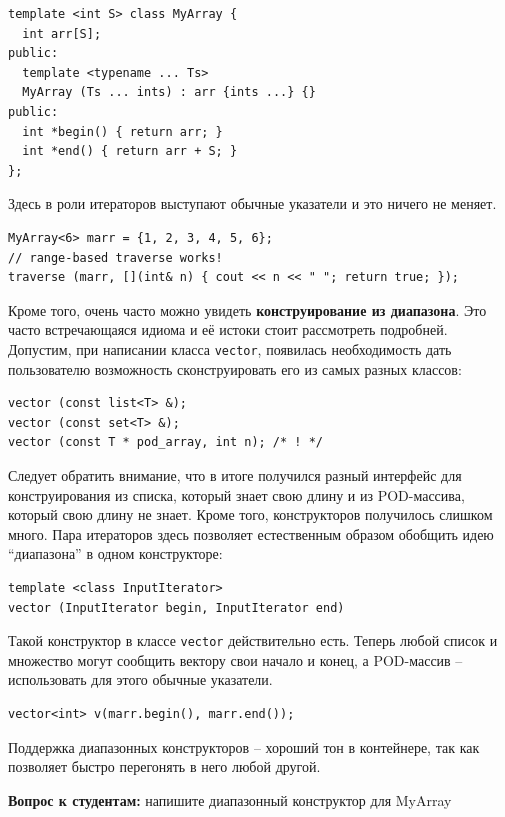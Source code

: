 \documentclass[a4paper,12pt,oneside]{article}
\begin{document}
\begin{lstlisting}
template <int S> class MyArray {
  int arr[S];
public:
  template <typename ... Ts>
  MyArray (Ts ... ints) : arr {ints ...} {}
public:
  int *begin() { return arr; }
  int *end() { return arr + S; }
};
\end{lstlisting}

Здесь в роли итераторов выступают обычные указатели и это ничего не меняет.

\begin{lstlisting}
MyArray<6> marr = {1, 2, 3, 4, 5, 6};
// range-based traverse works!
traverse (marr, [](int& n) { cout << n << " "; return true; });
\end{lstlisting}

Кроме того, очень часто можно увидеть \textbf{конструирование из диапазона}. Это часто встречающаяся идиома и её истоки стоит рассмотреть подробней. Допустим, при написании класса \lstinline!vector!, появилась необходимость дать пользователю возможность сконструировать его из самых разных классов:

\begin{lstlisting}
vector (const list<T> &); 
vector (const set<T> &); 
vector (const T * pod_array, int n); /* ! */
\end{lstlisting}

Следует обратить внимание, что в итоге получился разный интерфейс для конструирования из списка, который знает свою длину и из POD-массива, который свою длину не знает. Кроме того, конструкторов получилось слишком много. Пара итераторов здесь позволяет естественным образом обобщить идею ``диапазона'' в одном конструкторе:

\begin{lstlisting}
template <class InputIterator>
vector (InputIterator begin, InputIterator end) 
\end{lstlisting}

Такой конструктор в классе \lstinline!vector! действительно есть. Теперь любой список и множество могут сообщить вектору свои начало и конец, а POD-массив -- использовать для этого обычные указатели.

\begin{lstlisting}
vector<int> v(marr.begin(), marr.end());
\end{lstlisting}

Поддержка диапазонных конструкторов -- хороший тон в контейнере, так как позволяет быстро перегонять в него любой другой.

\textbf{Вопрос к студентам:} напишите диапазонный конструктор для MyArray
\end{document}
